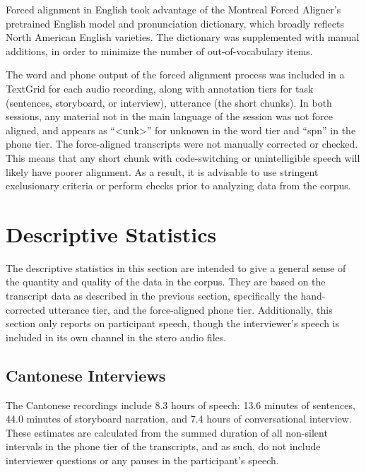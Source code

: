 Forced alignment in English took advantage of the Montreal Forced Aligner's pretrained English model and pronunciation dictionary, which broadly reflects North American English varieties. The dictionary was supplemented with manual additions, in order to minimize the number of out-of-vocabulary items.

The word and phone output of the forced alignment process was included in a TextGrid for each audio recording, along with annotation tiers for task (sentences, storyboard, or interview), utterance (the short chunks). In both sessions, any material not in the main language of the session was not force aligned, and appears as ``<unk>'' for unknown in the word tier and ``spn'' in the phone tier. The force-aligned transcripts were not manually corrected or checked. This means that any short chunk with code-switching or unintelligible speech will likely have poorer alignment. As a result, it is advisable to use stringent exclusionary criteria or perform checks prior to analyzing data from the corpus. 

\section{Descriptive Statistics}\label{ch2:sec:statistics}
The descriptive statistics in this section are intended to give a general sense of the quantity and quality of the data in the corpus. They are based on the transcript data as described in the previous section, specifically the hand-corrected utterance tier, and the force-aligned phone tier. Additionally, this section only reports on participant speech, though the interviewer's speech is included in its own channel in the stero audio files.

\subsection{Cantonese Interviews}\label{ch2:subsec:cantonese_descriptive}

The Cantonese recordings include 8.3 hours of speech: 13.6 minutes of sentences, 44.0 minutes of storyboard narration, and 7.4 hours of conversational interview. These estimates are calculated from the summed duration of all non-silent intervals in the phone tier of the transcripts, and as such, do not include interviewer questions or any pauses in the participant's speech. 

